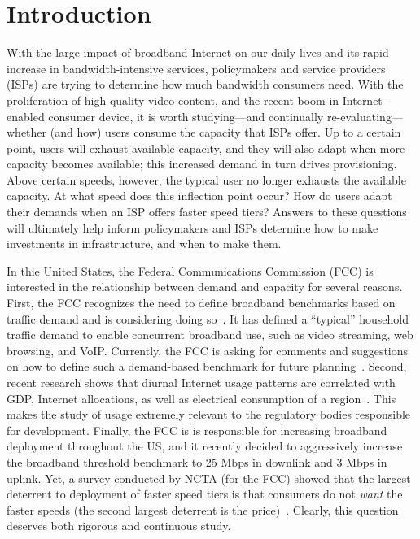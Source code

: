 \section{Introduction}\label{sec:introduction}

With the large impact of broadband Internet on our daily lives and its
rapid increase in bandwidth-intensive services, policymakers and service
providers (ISPs) are trying to determine how much bandwidth consumers
need. With the proliferation of high quality video content, and the
recent boom in Internet-enabled consumer device, it is worth
studying---and continually re-evaluating---whether (and how) users
consume the capacity that ISPs offer.  Up to a certain point, users will
exhaust available capacity, and they will also adapt when more capacity
becomes available; this increased demand in turn drives provisioning.
Above certain speeds, however, the typical user no longer exhausts the
available capacity. At what speed does this inflection point occur?  How
do users adapt their demands when an ISP offers faster speed tiers?
Answers to these questions will ultimately help inform policymakers and
ISPs determine how to make investments in infrastructure, and when to
make them.

In thie United States, the Federal Communications Commission (FCC) is
interested in the relationship between demand and capacity for several
reasons.  First, the FCC recognizes the need to define broadband
benchmarks based on traffic demand and is considering doing
so~\cite{fcc2015broadband-report}. It has defined a ``typical''
household traffic demand to enable concurrent broadband use, such as
video streaming, web browsing, and VoIP. Currently, the FCC is asking
for comments and suggestions on how to define such a demand-based
benchmark for future planning~\cite{fcc2015progress-report,
  fcc2014progress-report}.  Second, recent research shows that diurnal
Internet usage patterns are correlated with GDP, Internet allocations,
as well as electrical consumption of a
region~\cite{ant-diurnal-web}. This makes the study of usage extremely
relevant to the regulatory bodies responsible for development.  Finally,
the FCC is is responsible for increasing broadband deployment throughout
the US, and it recently decided to aggressively increase the broadband
threshold benchmark to 25 Mbps in downlink and 3 Mbps in uplink.  Yet, a
survey conducted by NCTA (for the FCC) showed that the largest deterrent
to deployment of faster speed tiers is that consumers do not \emph{want}
the faster speeds (the second largest deterrent is the
price)~\cite{fcc2015progress-report}. Clearly, this question deserves
both rigorous and continuous study.

